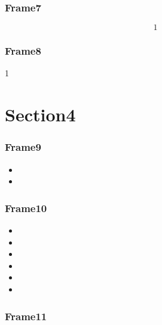 \documentclass[xcolor={usenames,dvipsnames}, 
	hyperref={
	colorlinks=false, 						%
	linkcolor=black, 						%
	urlcolor=black,							%
	citecolor=black,						%
	pdfpagelabels=false,
	},
	ignorenonframetext,			%
	compress					%
]{beamer}
\begin{document}
\begin{frame}
	\frametitle{Frame7}
	
	\begin{equation*}
		1
	\end{equation*}

\end{frame}

\begin{frame}
	\frametitle{Frame8}
	
	
	\begin{block}{}
	1
	\end{block}
	
\end{frame}

\section{Section4}
\begin{frame}
\frametitle{Frame9}


\begin{itemize}
\item
\item 
\end{itemize}

\end{frame}


\begin{frame}
\frametitle{Frame10}
\begin{itemize}
	\item 
	\item
	\item 
	\item
	\item 
	\item 
\end{itemize}
\end{frame}

\begin{frame}
\frametitle{Frame11}

\end{frame}






\end{document}
